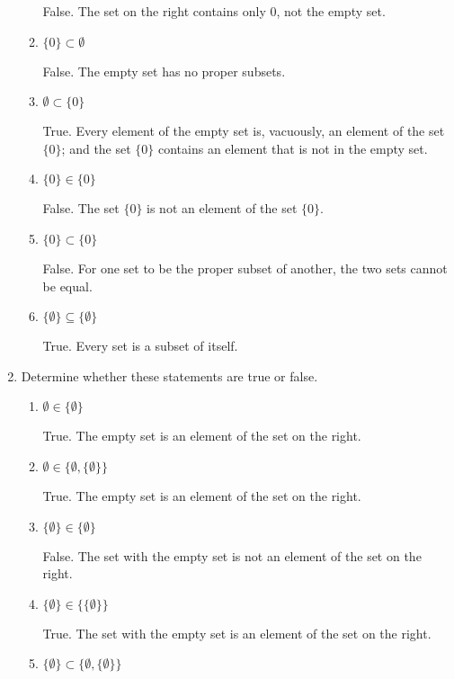 \documentclass[11pt]{article}
\begin{document}
\begin{enumerate}[label=\textbf{\arabic*.}]
\begin{enumerate}[label=\textbf{\alph*)}]
		False. The set on the right contains only 0, not the empty set.
		
		\item $\{0\} \subset \emptyset$
		
		False. The empty set has no proper subsets.
		
		\item $\emptyset \subset \{0\}$
		
		True. Every element of the empty set is, vacuously, an element of the set $\{0\}$; and the set $\{0\}$ contains an element that is not in the empty set.
		
		\item $\{0\} \in \{0\}$
		
		False. The set $\{0\}$ is not an element of the set $\{0\}$.
		
		\item $\{0\} \subset \{0\}$
		
		False. For one set to be the proper subset of another, the two sets cannot be equal.
		
		\item $\{\emptyset\} \subseteq \{\emptyset\}$
		
		True. Every set is a subset of itself.
	\end{enumerate}

	\item Determine whether these statements are true or false.
	
	\begin{enumerate}[label=\textbf{\alph*)}]
		\item $\emptyset \in \{\emptyset\}$
		
		True. The empty set is an element of the set on the right.
		
		\item $\emptyset \in \{\emptyset, \{\emptyset\}\}$
		
		True. The empty set is an element of the set on the right.
		
		\item $\{\emptyset\} \in \{\emptyset\}$
		
		False. The set with the empty set is not an element of the set on the right.
		
		\item $\{\emptyset\} \in \{\{\emptyset\}\}$
		
		True. The set with the empty set is an element of the set on the right.
		
		\item $\{\emptyset\} \subset \{\emptyset, \{\emptyset\}\}$
		

\end{enumerate}
\end{enumerate}
\end{document}
